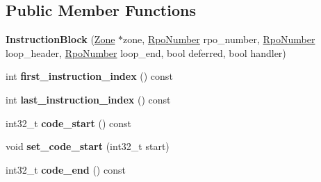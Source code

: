 \subsection*{Public Member Functions}
\begin{DoxyCompactItemize}
\item 
{\bfseries Instruction\+Block} (\hyperlink{classv8_1_1internal_1_1_zone}{Zone} $\ast$zone, \hyperlink{classv8_1_1internal_1_1compiler_1_1_rpo_number}{Rpo\+Number} rpo\+\_\+number, \hyperlink{classv8_1_1internal_1_1compiler_1_1_rpo_number}{Rpo\+Number} loop\+\_\+header, \hyperlink{classv8_1_1internal_1_1compiler_1_1_rpo_number}{Rpo\+Number} loop\+\_\+end, bool deferred, bool handler)\hypertarget{classv8_1_1internal_1_1compiler_1_1_instruction_block_a3542b48244389985570340f50a7d8a80}{}\label{classv8_1_1internal_1_1compiler_1_1_instruction_block_a3542b48244389985570340f50a7d8a80}

\item 
int {\bfseries first\+\_\+instruction\+\_\+index} () const \hypertarget{classv8_1_1internal_1_1compiler_1_1_instruction_block_ab65604a235f4cb50e580de63e660f5d3}{}\label{classv8_1_1internal_1_1compiler_1_1_instruction_block_ab65604a235f4cb50e580de63e660f5d3}

\item 
int {\bfseries last\+\_\+instruction\+\_\+index} () const \hypertarget{classv8_1_1internal_1_1compiler_1_1_instruction_block_a791d9fe04e6e8a5246e3399b0b2453ad}{}\label{classv8_1_1internal_1_1compiler_1_1_instruction_block_a791d9fe04e6e8a5246e3399b0b2453ad}

\item 
int32\+\_\+t {\bfseries code\+\_\+start} () const \hypertarget{classv8_1_1internal_1_1compiler_1_1_instruction_block_a53c480595276a7e1213f4496eb42f1ca}{}\label{classv8_1_1internal_1_1compiler_1_1_instruction_block_a53c480595276a7e1213f4496eb42f1ca}

\item 
void {\bfseries set\+\_\+code\+\_\+start} (int32\+\_\+t start)\hypertarget{classv8_1_1internal_1_1compiler_1_1_instruction_block_a09326e22bbb1d4a75410a128efa14a94}{}\label{classv8_1_1internal_1_1compiler_1_1_instruction_block_a09326e22bbb1d4a75410a128efa14a94}

\item 
int32\+\_\+t {\bfseries code\+\_\+end} () const \hypertarget{classv8_1_1internal_1_1compiler_1_1_instruction_block_a9b7a760fc88323c7d13234d17bde9a3e}{}\label{classv8_1_1internal_1_1compiler_1_1_instruction_block_a9b7a760fc88323c7d13234d17bde9a3e}


\end{DoxyCompactItemize}
